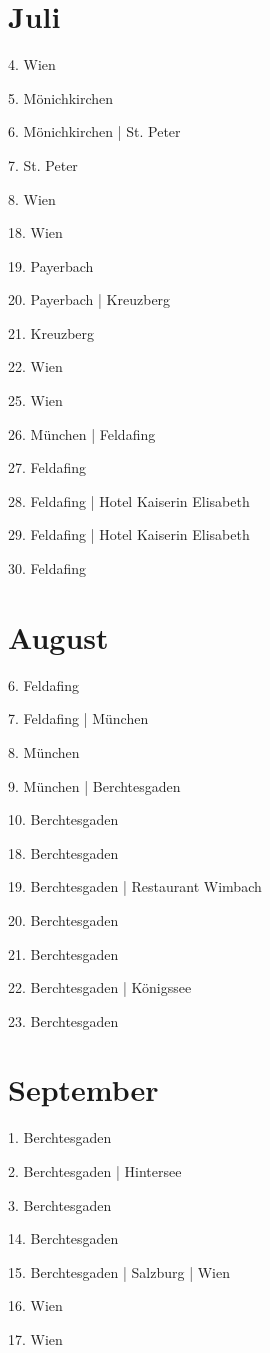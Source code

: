 \documentclass[twoside=false,titlepage=false,open=any, parskip=never, fontsize=10pt, headings=small, chapterprefix=false, appendixprefix=false, DIV=15]{scrbook}
\begin{document}
\begin{multicols}{3}
            \section*{Juli}
            4. Wien\par
            5. Mönichkirchen\par
            6. Mönichkirchen | St. Peter\par
            7. St. Peter\par
            8. Wien\par
            18. Wien\par
            19. Payerbach\par
            20. Payerbach | Kreuzberg\par
            21. Kreuzberg\par
            22. Wien\par
            25. Wien\par
            26. München | Feldafing\par
            27. Feldafing\par
            28. Feldafing | Hotel Kaiserin Elisabeth\par
            29. Feldafing | Hotel Kaiserin Elisabeth\par
            30. Feldafing\par
            \section*{August}
            6. Feldafing\par
            7. Feldafing | München\par
            8. München\par
            9. München | Berchtesgaden\par
            10. Berchtesgaden\par
            18. Berchtesgaden\par
            19. Berchtesgaden | Restaurant Wimbach\par
            20. Berchtesgaden\par
            21. Berchtesgaden\par
            22. Berchtesgaden | Königssee\par
            23. Berchtesgaden\par
            \section*{September}
            1. Berchtesgaden\par
            2. Berchtesgaden | Hintersee\par
            3. Berchtesgaden\par
            14. Berchtesgaden\par
            15. Berchtesgaden | Salzburg | Wien\par
            16. Wien\par
            17. Wien\par

\end{multicols}
\end{document}
